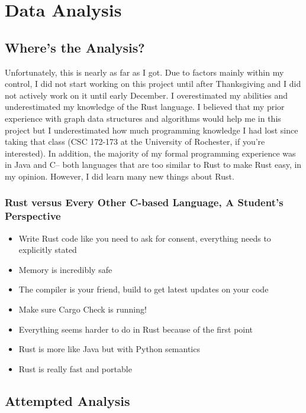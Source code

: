 \documentclass[12pt,letterpaper]{article}
\begin{document}
\section{Data Analysis}

\subsection{Where's the Analysis?}

Unfortunately,  this is nearly as far as I got.  Due to factors mainly within my control,  I did not start working on this project until after Thanksgiving and I did not actively work on it until early December.  I overestimated my abilities and underestimated my knowledge of the Rust language.  I believed that my prior experience with graph data structures and algorithms would help me in this project but I underestimated how much programming knowledge I had lost since taking that class (CSC 172-173 at the University of Rochester, if you're interested). In addition, the majority of my formal programming experience was in Java and C-- both languages that are too similar to Rust to make Rust easy, in my opinion. However, I did learn many new things about Rust. 

\subsubsection{Rust versus Every Other C-based Language,  A Student's Perspective}
\begin{itemize}
	\item Write Rust code like you need to ask for consent, everything needs to explicitly stated 
	\item Memory is incredibly safe 
	\item The compiler is your friend,  build to get latest updates on your code 
	\item Make sure Cargo Check is running! 
	\item Everything seems harder to do in Rust because of the first point 
	\item Rust is more like Java but with Python semantics   
	\item Rust is really fast and portable 
\end{itemize}


\subsection{Attempted Analysis}
\end{document}
